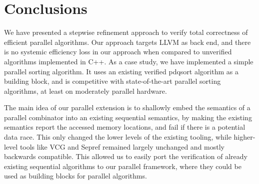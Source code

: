 \documentclass[runningheads]{llncs}
\begin{document}
%
%
%




  \section{Conclusions}\label{sec:concl}
    We have presented a stepwise refinement approach to verify total correctness of efficient parallel algorithms.
    Our approach targets LLVM as back end, and there is no systemic efficiency loss in our approach
    when compared to unverified algorithms implemented in C++.
    As a case study, we have implemented a simple parallel sorting algorithm.
    It uses an existing verified pdqsort algorithm as a building block,
    and is competitive with state-of-the-art parallel sorting algorithms,
    at least on moderately parallel hardware.

    The main idea of our parallel extension is to shallowly embed the semantics of a
    parallel combinator into an existing sequential semantics, by making the existing
    semantics report the accessed memory locations, and fail if there is a potential data race.
    This only changed the lower levels of the existing tooling, while higher-level tools
    like VCG and Sepref remained largely unchanged and mostly backwards compatible.
    This allowed us to easily port the verification of already existing sequential algorithms
    to our parallel framework, where they could be used as building blocks for parallel algorithms.
\end{document}
